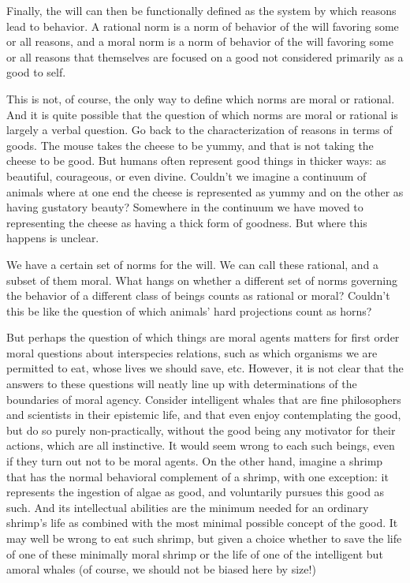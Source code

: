 Finally, the will can then be functionally defined as the system by which reasons lead to behavior. A rational norm is a norm of behavior
of the will favoring some or all reasons, and a moral norm is a norm of behavior of the will favoring some or all reasons that themselves 
are focused on  a good not considered primarily as a good to self. 

This is not, of course, the only way to define which norms are moral or rational. And it is quite possible that the question of which
norms are moral or rational is largely a verbal question. Go back to the characterization of reasons in terms of goods. The mouse takes
the cheese to be yummy, and that is not taking the cheese to be good. But humans often represent good things in thicker ways: as
beautiful, courageous, or even divine. Couldn't we imagine a continuum of animals where at one end the cheese is represented as 
yummy and on the other as having gustatory beauty? Somewhere in the continuum we have moved to representing the cheese as having a 
thick form of goodness. But where this happens is unclear. 

We have a certain set of norms for the will. We can call these rational, and a subset of them moral. What hangs on whether a different
set of norms governing the behavior of a different class of beings counts as rational or moral? Couldn't this be like the question of
which animals' hard projections count as horns? 

But perhaps the question of which things are moral agents matters for first order moral questions about interspecies relations, such 
as which organisms we are permitted to eat, whose lives we should save, etc. However, it is not clear that the answers to these questions will neatly line up with
determinations of the boundaries of moral agency. Consider intelligent whales that are fine philosophers and scientists in their epistemic life, 
and that even enjoy contemplating the good, but do so purely non-practically, without the good being any motivator for their 
actions, which are all instinctive. It would seem wrong to each such beings, even if they turn out not to be moral agents.
On the other hand, imagine a shrimp that has the normal behavioral complement of a shrimp, with one exception: it represents
the ingestion of algae as good, and voluntarily pursues this good as such. And its intellectual abilities are the minimum needed
for an ordinary shrimp's life as combined with the most minimal possible concept of the good. It may well be wrong to eat such shrimp,
but given a choice whether to save the life of one of these minimally moral shrimp or the life of one of the intelligent but amoral 
whales (of course, we should not be biased here by size!)


